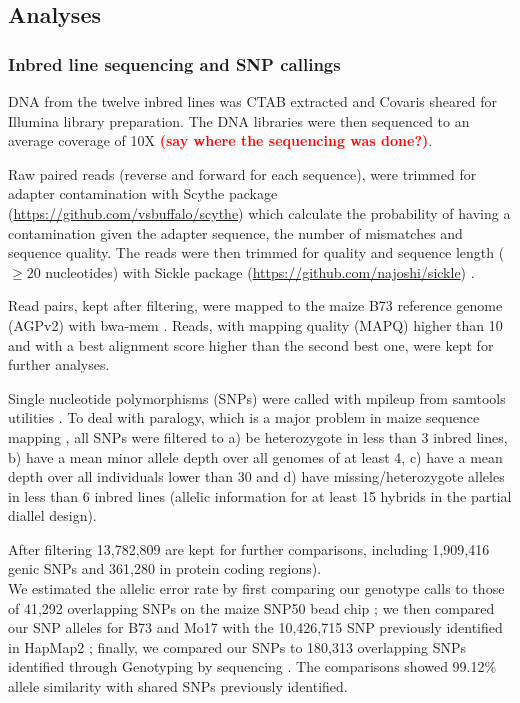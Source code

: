 \documentclass[10pt]{article}
\newcommand{\sme}[1]{\textcolor{red}{\bf #1}}
\begin{document}
\subsection*{Analyses}

\subsubsection*{Inbred line sequencing and SNP callings}

DNA from the twelve inbred lines was CTAB extracted \citep{Doyle1987} and Covaris sheared for Illumina library preparation. The DNA libraries were then sequenced to an average coverage of 10X \sme{(say where the sequencing was done?)}.

Raw paired reads (reverse and forward for each sequence), were trimmed for adapter contamination with Scythe package (\url{https://github.com/vsbuffalo/scythe}) which calculate the probability of having a contamination given the adapter sequence, the number of mismatches and sequence quality. The reads were then trimmed for quality and sequence length ($\geq 20$ nucleotides) with Sickle package (\url{https://github.com/najoshi/sickle}) .

Read pairs, kept after filtering,  were mapped to the maize B73 reference genome (AGPv2) with bwa-mem \citep{Li2009B}. Reads, with mapping quality (MAPQ) higher than 10 and with a best alignment score higher than the second best one, were kept for further analyses.

Single nucleotide polymorphisms (SNPs) were called with mpileup from samtools utilities \citep{Li2009}. To deal with paralogy, which is a major problem in maize sequence mapping \citep{Chia2012}, all SNPs were filtered to a) be heterozygote in less than 3 inbred lines, b) have a mean minor allele depth over all genomes of at least 4, c) have a mean depth over all individuals lower than 30 and d) have missing/heterozygote alleles in less than 6 inbred lines (allelic information for at least 15 hybrids in the partial diallel design). 

After filtering 13,782,809 are kept for further comparisons, including 1,909,416 genic SNPs and 361,280 in protein coding regions). \\
We estimated the allelic error rate by first comparing our genotype calls to those of 41,292 overlapping SNPs on the maize SNP50 bead chip \citep{Heerwaarden2012};  we then compared our SNP alleles for B73 and Mo17 with the 10,426,715 SNP previously identified in HapMap2 \citep{Chia2012}; finally, we compared our SNPs to 180,313 overlapping SNPs identified through Genotyping by sequencing \citep{Romay2013}. The comparisons showed 99.12\% allele similarity with shared SNPs previously identified. 
\end{document}
